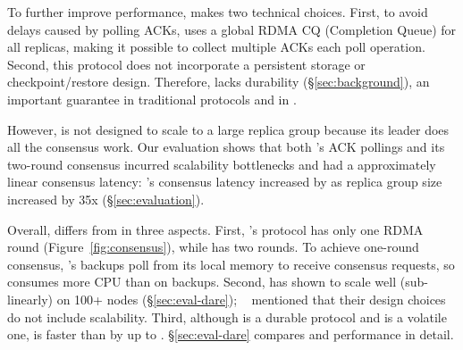 % 


To further improve performance, \dare makes two technical choices. First, to 
avoid delays caused by polling ACKs, \dare uses a global RDMA CQ (Completion 
Queue) for all replicas, making it possible to collect multiple ACKs each poll 
operation. Second, this protocol does not incorporate a persistent storage or 
checkpoint/restore design. Therefore, \dare lacks durability 
(\S\ref{sec:background}), an important guarantee in traditional \paxos 
protocols and in \xxx.


However, \dare is not designed to scale to a large replica group because its 
leader does all the consensus work. Our evaluation shows that both \dare's ACK 
pollings and its two-round consensus incurred scalability bottlenecks and had a
approximately linear consensus latency: \dare's consensus latency increased by 
\darescalability as replica group size increased by 35x 
(\S\ref{sec:evaluation}).

Overall, \xxx differs from \dare in three aspects. First, \xxx's protocol has 
only one RDMA round (Figure~\ref{fig:consensus}), while \dare has two 
rounds. To achieve one-round consensus, \xxx's backups poll from its local 
memory to receive consensus requests, so \xxx consumes more CPU than \dare on 
backups. Second, \xxx has shown to scale well (sub-linearly) on 100+ nodes 
(\S\ref{sec:eval-dare}); \dare~\cite{dare:hpdc15} mentioned that their design 
choices do not include scalability. Third, although \xxx is a durable protocol 
and \dare is a volatile one, \xxx is faster than \dare by up to 
\fasterDARE. \S\ref{sec:eval-dare} compares \xxx and \dare 
performance in detail.

